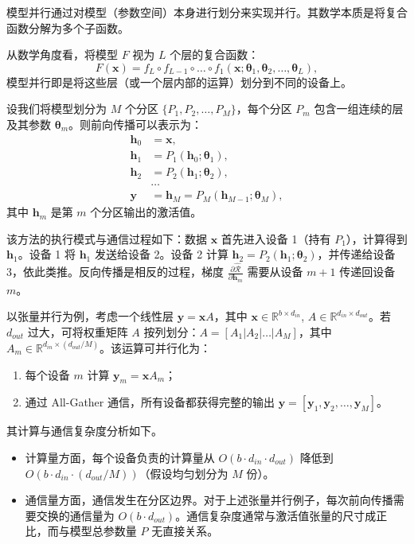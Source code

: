 模型并行通过对模型（参数空间）本身进行划分来实现并行。其数学本质是将复合函数分解为多个子函数。

从数学角度看，将模型 $F$ 视为 $L$ 个层的复合函数：
\begin{equation}
    F(\bm{x}) = f_L \circ f_{L-1} \circ \dots \circ f_1(\bm{x}; \bm{\theta}_1, \bm{\theta}_2, \dots, \bm{\theta}_L),
\end{equation}
模型并行即是将这些层（或一个层内部的运算）划分到不同的设备上。

设我们将模型划分为 $M$ 个分区 $\{P_1, P_2, \dots, P_M\}$，每个分区 $P_m$ 包含一组连续的层及其参数 $\bm{\theta}_m$。则前向传播可以表示为：
\begin{equation}
    \begin{aligned}
        \bm{h}_0 & = \bm{x},                                      \\
        \bm{h}_1 & = P_1(\bm{h}_0; \bm{\theta}_1),                \\
        \bm{h}_2 & = P_2(\bm{h}_1; \bm{\theta}_2),                \\
                 & \dots                                          \\
        \bm{y}   & = \bm{h}_M = P_M(\bm{h}_{M-1}; \bm{\theta}_M),
    \end{aligned}
\end{equation}
其中 $\bm{h}_m$ 是第 $m$ 个分区输出的激活值。

该方法的执行模式与通信过程如下：数据 $\bm{x}$ 首先进入设备 1（持有 $P_1$），计算得到 $\bm{h}_1$。设备 1 将 $\bm{h}_1$ 发送给设备 2。设备 2 计算 $\bm{h}_2 = P_2(\bm{h}_1; \bm{\theta}_2)$，并传递给设备 3，依此类推。反向传播是相反的过程，梯度 $\frac{\partial \hat{\mathcal{R}}}{\partial \bm{h}_m}$ 需要从设备 $m+1$ 传递回设备 $m$。

以张量并行为例，考虑一个线性层 $\bm{y} = \bm{x}A$，其中 $\bm{x} \in \mathbb{R}^{b \times d_{in}}$, $A \in \mathbb{R}^{d_{in} \times d_{out}}$。若 $d_{out}$ 过大，可将权重矩阵 $A$ 按列划分：$A = [A_1 | A_2 | \dots | A_M]$，其中 $A_m \in \mathbb{R}^{d_{in} \times (d_{out}/M)}$。该运算可并行化为：
\begin{enumerate}
    \item 每个设备 $m$ 计算 $\bm{y}_m = \bm{x}A_m$；
    \item 通过 All-Gather 通信，所有设备都获得完整的输出 $\bm{y} = [\bm{y}_1, \bm{y}_2, \dots, \bm{y}_M]$。
\end{enumerate}

其计算与通信复杂度分析如下。
\begin{itemize}
    \item 计算量方面，每个设备负责的计算量从 $O(b \cdot d_{in} \cdot d_{out})$ 降低到 $O(b \cdot d_{in} \cdot (d_{out}/M))$（假设均匀划分为 $M$ 份）。
    \item 通信量方面，通信发生在分区边界。对于上述张量并行例子，每次前向传播需要交换的通信量为 $O(b \cdot d_{out})$。通信复杂度通常与激活值张量的尺寸成正比，而与模型总参数量 $P$ 无直接关系。
\end{itemize}

